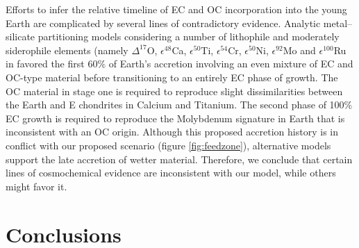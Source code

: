 \documentclass[trackchanges,twocolumn]{aastex}
\begin{document}
Efforts to infer the relative timeline of EC and OC incorporation into the young Earth are complicated by several lines of contradictory evidence.  Analytic metal–silicate partitioning models considering a number of lithophile and moderately siderophile elements (namely $\Delta^{17}$O, $\epsilon^{48}$Ca, $\epsilon^{50}$Ti, $\epsilon^{54}$Cr, $\epsilon^{50}$Ni, $\epsilon^{92}$Mo and $\epsilon^{100}$Ru in \citet{dauphas17} favored the first 60$\%$ of Earth's accretion involving an even mixture of EC and OC-type material before transitioning to an entirely EC phase of growth.  The OC material in stage one is required to reproduce slight dissimilarities between the Earth and E chondrites in Calcium and Titanium.  The second phase of 100$\%$ EC growth is required to reproduce the Molybdenum signature in Earth that is inconsistent with an OC origin.  Although this proposed accretion history is in conflict with our proposed scenario (figure \ref{fig:feedzone}), alternative models \citep[e.g.:][]{schonbaschler10} support the late accretion of wetter material.  Therefore, we conclude that certain lines of cosmochemical evidence are inconsistent with our model, while others might favor it.

\section{Conclusions}
\end{document}

